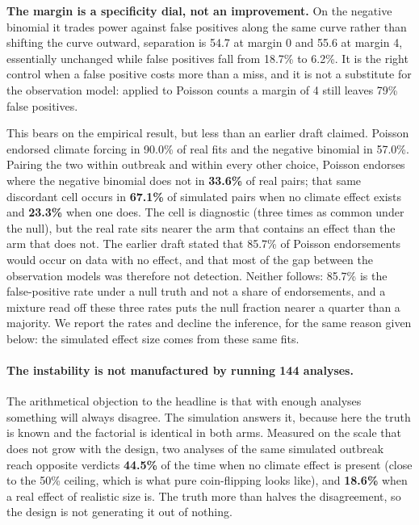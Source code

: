 \documentclass[11pt,a4paper]{article}
\begin{document}
\textbf{The margin is a specificity dial, not an improvement.} On the negative
binomial it trades power against false positives along the same curve rather than
shifting the curve outward, separation is 54.7 at margin 0 and 55.6 at margin
4, essentially unchanged while false positives fall from 18.7\% to 6.2\%. It is
the right control when a false positive costs more than a miss, and it is not a
substitute for the observation model: applied to Poisson counts a margin of 4
still leaves 79\% false positives.

This bears on the empirical result, but less than an earlier draft claimed.
Poisson endorsed climate forcing in 90.0\% of real fits and the negative binomial
in 57.0\%. Pairing the two within outbreak and within every other choice, Poisson
endorses where the negative binomial does not in \textbf{33.6\%} of real pairs;
that same discordant cell occurs in \textbf{67.1\%} of simulated pairs when no
climate effect exists and \textbf{23.3\%} when one does. The cell is diagnostic
 (three times as common under the null), but the real rate sits nearer the arm
that contains an effect than the arm that does not. The earlier draft stated that
85.7\% of Poisson endorsements would occur on data with no effect, and that most
of the gap between the observation models was therefore not detection. Neither
follows: 85.7\% is the false-positive rate under a null truth and not a share of
endorsements, and a mixture read off these three rates puts the null fraction
nearer a quarter than a majority. We report the rates and decline the inference,
for the same reason given below: the simulated effect size comes from these
same fits.

\paragraph{The instability is not manufactured by running 144 analyses.} The
arithmetical objection to the headline is that with enough analyses something will
always disagree. The simulation answers it, because here the truth is known and
the factorial is identical in both arms. Measured on the scale that does not grow
with the design, two analyses of the same simulated outbreak reach opposite
verdicts \textbf{44.5\%} of the time when no climate effect is present (close to
the 50\% ceiling, which is what pure coin-flipping looks like), and
\textbf{18.6\%} when a real effect of realistic size is. The truth more than
halves the disagreement, so the design is not generating it out of nothing.
\end{document}
